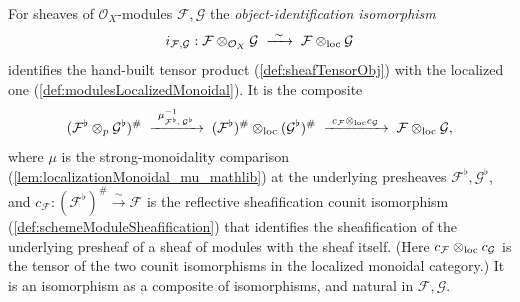\begin{definition}

  \label{def:tensorObjLocalizedIso}
  For sheaves of \(\mathcal{O}_X\)-modules \(\mathcal{F}, \mathcal{G}\) the
  \emph{object-identification isomorphism}
  \[
    i_{\mathcal{F},\mathcal{G}} :
      \mathcal{F} \otimes_{\mathcal{O}_X} \mathcal{G}
      \;\xrightarrow{\ \sim\ }\;
      \mathcal{F} \mathbin{\otimes_{\mathrm{loc}}} \mathcal{G}
  \]
  identifies the hand-built tensor product (\cref{def:sheafTensorObj}) with the
  localized one (\cref{def:modulesLocalizedMonoidal}). It is the composite
  \[
    (\mathcal{F}^{\flat} \otimes_p \mathcal{G}^{\flat})^{\#}
      \;\xrightarrow{\ \mu_{\mathcal{F}^{\flat},\,\mathcal{G}^{\flat}}^{-1}\ }\;
      (\mathcal{F}^{\flat})^{\#} \lotimes (\mathcal{G}^{\flat})^{\#}
      \;\xrightarrow{\ c_{\mathcal{F}} \lotimes c_{\mathcal{G}}\ }\;
      \mathcal{F} \lotimes \mathcal{G},
  \]
  where \(\mu\) is the strong-monoidality comparison
  (\cref{lem:localizationMonoidal_mu_mathlib}) at the underlying presheaves
  \(\mathcal{F}^{\flat}, \mathcal{G}^{\flat}\), and
  \(c_{\mathcal{F}} : (\mathcal{F}^{\flat})^{\#} \xrightarrow{\sim} \mathcal{F}\)
  is the reflective sheafification counit isomorphism
  (\cref{def:schemeModuleSheafification}) that identifies the sheafification of the
  underlying presheaf of a sheaf of modules with the sheaf itself. (Here
  \(c_{\mathcal{F}} \mathbin{\otimes_{\mathrm{loc}}} c_{\mathcal{G}}\) is the tensor of the two counit
  isomorphisms in the localized monoidal category.) It is an isomorphism as a
  composite of isomorphisms, and natural in \(\mathcal{F}, \mathcal{G}\).
\end{definition}

